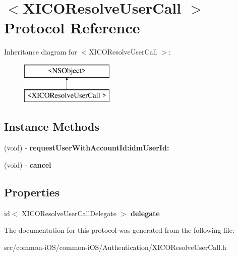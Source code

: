 \hypertarget{protocol_x_i_c_o_resolve_user_call_01-p}{}\section{$<$X\+I\+C\+O\+Resolve\+User\+Call $>$ Protocol Reference}
\label{protocol_x_i_c_o_resolve_user_call_01-p}
Inheritance diagram for $<$X\+I\+C\+O\+Resolve\+User\+Call $>$\+:\begin{figure}[H]
\begin{center}
\leavevmode
\includegraphics[height=2.000000cm]{protocol_x_i_c_o_resolve_user_call_01-p}
\end{center}
\end{figure}
\subsection*{Instance Methods}
\begin{DoxyCompactItemize}
\item 
\hypertarget{protocol_x_i_c_o_resolve_user_call_01-p_aaba113bc836a402d8bb80f657b33515e}{}\label{protocol_x_i_c_o_resolve_user_call_01-p_aaba113bc836a402d8bb80f657b33515e} 
(void) -\/ {\bfseries request\+User\+With\+Account\+Id\+:idm\+User\+Id\+:}
\item 
\hypertarget{protocol_x_i_c_o_resolve_user_call_01-p_ae7aee68b8a5e83ca5ebcf2db267e9e7b}{}\label{protocol_x_i_c_o_resolve_user_call_01-p_ae7aee68b8a5e83ca5ebcf2db267e9e7b} 
(void) -\/ {\bfseries cancel}
\end{DoxyCompactItemize}
\subsection*{Properties}
\begin{DoxyCompactItemize}
\item 
\hypertarget{protocol_x_i_c_o_resolve_user_call_01-p_aca506d38461c8c9ee98e52e374b79b96}{}\label{protocol_x_i_c_o_resolve_user_call_01-p_aca506d38461c8c9ee98e52e374b79b96} 
id$<$ X\+I\+C\+O\+Resolve\+User\+Call\+Delegate $>$ {\bfseries delegate}
\end{DoxyCompactItemize}


The documentation for this protocol was generated from the following file\+:\begin{DoxyCompactItemize}
\item 
src/common-\/i\+O\+S/common-\/i\+O\+S/\+Authentication/X\+I\+C\+O\+Resolve\+User\+Call.\+h\end{DoxyCompactItemize}
